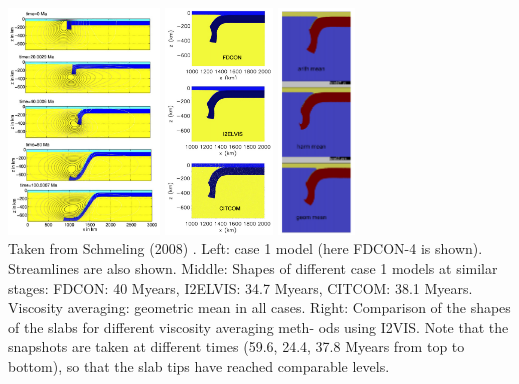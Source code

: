 \begin{center}
\includegraphics[height=6cm]{images/benchmark_scbe08/scbe08_2}
\includegraphics[height=6cm]{images/benchmark_scbe08/scbe08_1}
\includegraphics[height=6cm]{images/benchmark_scbe08/scbe08_3}\\
{\captionfont Taken from Schmeling \etal (2008) \cite{scbe08}.
Left: case 1 model (here FDCON-4 is shown). Streamlines are also shown.
Middle: Shapes of different case 1 models at similar stages: FDCON: 40 Myears,
I2ELVIS: 34.7 Myears, CITCOM: 38.1 Myears. Viscosity averaging: geometric mean
in all cases.
Right: Comparison of the shapes of the slabs for different viscosity averaging meth-
ods using I2VIS. Note that the snapshots are taken at different times (59.6, 24.4,
37.8 Myears from top to bottom), so that the slab tips have reached comparable
levels.}
\end{center}

